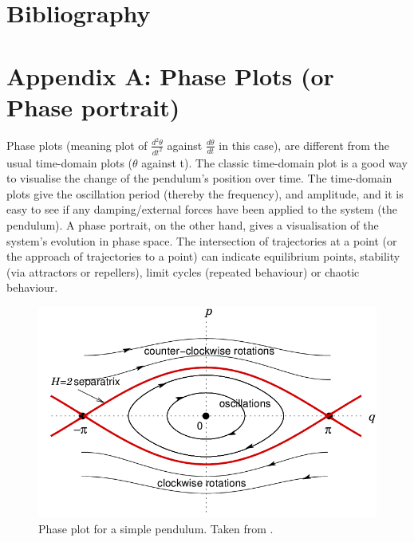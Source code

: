 \documentclass[10pt, twocolumn]{article}
\begin{document}
\newpage
\section{Bibliography}



\onecolumn
\newpage
\section{Appendix A: Phase Plots (or Phase portrait)} \label{phase plots appendix}
Phase plots (meaning plot of $\frac{d^2\theta}{dt^2}$ against $\frac{d\theta}{dt}$ in this case), are different from the usual time-domain plots ($\theta$ against t). The classic time-domain plot is a good way to visualise the change of the pendulum's position over time. The time-domain plots give the oscillation period (thereby the frequency), and amplitude, and it is easy to see if any damping/external forces have been applied to the system (the pendulum). A phase portrait, on the other hand, gives a visualisation of the system's evolution in phase space. The intersection of trajectories at a point (or the approach of trajectories to a point) can indicate equilibrium points, stability (via attractors or repellers), limit cycles (repeated behaviour) or chaotic behaviour.
\begin{figure}[H]
    \centering
    \includegraphics[width = 0.7\columnwidth]{Projects/ForcedSimplePendulum/WrittenReport/figs/The-phase-space-of-the-simple-pendulum.png}
    \caption{Phase plot for a simple pendulum. Taken from \cite{Ball2007}.}
    \label{fig:enter-label}
\end{figure}
\end{document}
